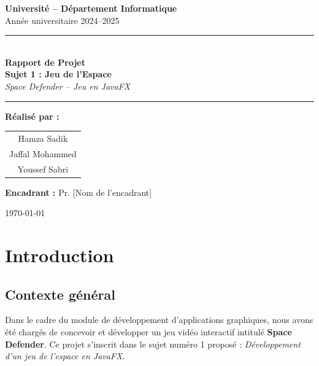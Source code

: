 \documentclass[12pt,a4paper]{report}
\begin{document}
\begin{titlepage}
  \centering

  \vspace*{1cm}

  {\Large \textbf{Université -- Département Informatique}}\\[0.3cm]
  {\large Année universitaire 2024--2025}

  \vspace{1.5cm}
  \rule{\linewidth}{1.5pt}\\[0.4cm]
  {\Huge \textbf{\color{bleuFonce} Rapport de Projet}}\\[0.3cm]
  {\LARGE \textbf{Sujet 1 : Jeu de l'Espace}}\\[0.2cm]
  {\Large \textit{Space Defender -- Jeu en JavaFX}}\\[0.2cm]
  \rule{\linewidth}{1.5pt}

  \vspace{2cm}

  {\large \textbf{Réalisé par :}}\\[0.5cm]
  \begin{tabular}{c}
    \large Hamza Sadik \\[0.3cm]
    \large Jaffal Mohammed \\[0.3cm]
    \large Youssef Sabri \\
  \end{tabular}

  \vspace{2cm}

  {\large \textbf{Encadrant :} Pr. [Nom de l'encadrant]}

  \vspace{2cm}

  {\large \today}

\end{titlepage}

\tableofcontents
\newpage

\chapter{Introduction}

\section{Contexte général}
Dans le cadre du module de développement d'applications graphiques, nous avons été chargés de concevoir et développer un jeu vidéo interactif intitulé \textbf{Space Defender}. Ce projet s'inscrit dans le sujet numéro 1 proposé : \textit{Développement d'un jeu de l'espace en JavaFX}.
\end{document}
